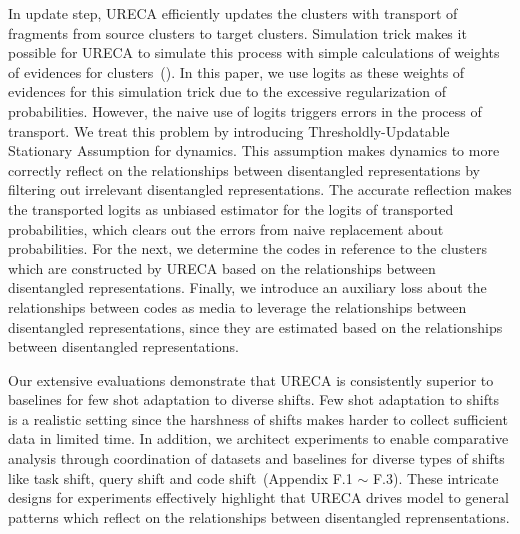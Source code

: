 In update step, URECA efficiently updates the clusters with transport of fragments from source clusters to target clusters.
Simulation trick makes it possible for URECA to simulate this process with simple calculations of weights of evidences 
for clusters~(\cite{Greiff00}). 
In this paper, we use logits as these weights of evidences for this simulation trick due to the excessive regularization of probabilities.
However, the naive use of logits triggers errors in the process of transport.
We treat this problem by introducing Thresholdly-Updatable Stationary Assumption 
for dynamics.
This assumption makes dynamics to more correctly reflect on the relationships between disentangled representations
by filtering out irrelevant disentangled representations. 
The accurate reflection makes the transported logits as unbiased estimator for the logits of transported probabilities,
which clears out the errors from naive replacement about probabilities.
For the next, we determine the codes in reference to the clusters which are constructed by URECA based on 
the relationships between disentangled representations. 
Finally, we introduce an auxiliary loss about the relationships between codes as media to leverage the relationships between disentangled 
representations, since they are estimated based on the relationships between disentangled representations. 

Our extensive evaluations demonstrate that URECA is consistently superior to baselines for few shot adaptation to diverse shifts. 
Few shot adaptation to shifts is a realistic setting since the harshness of shifts makes harder 
to collect sufficient data in limited time.
In addition, we architect experiments to enable comparative analysis 
through coordination of datasets and baselines for diverse types of shifts like task shift, query shift and 
code shift~(Appendix F.1 $\sim$ F.3).  
These intricate designs for experiments effectively highlight that URECA drives model to general patterns 
which reflect on the relationships between disentangled reprensentations.


